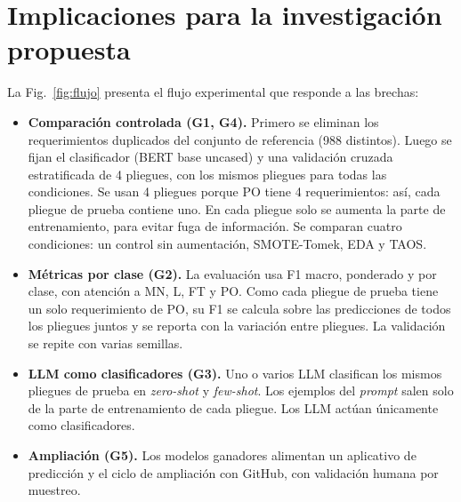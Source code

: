 \documentclass[conference]{IEEEtran}
\begin{document}
\section{Implicaciones para la investigación propuesta}\label{sec:propuesta}
La Fig.~\ref{fig:flujo} presenta el flujo experimental que responde a las brechas:
\begin{itemize}
  \item \textbf{Comparación controlada (G1, G4).} Primero se eliminan los requerimientos duplicados del conjunto de referencia (988 distintos). Luego se fijan el clasificador (BERT base uncased) y una validación cruzada estratificada de 4 pliegues, con los mismos pliegues para todas las condiciones. Se usan 4 pliegues porque PO tiene 4 requerimientos: así, cada pliegue de prueba contiene uno. En cada pliegue solo se aumenta la parte de entrenamiento, para evitar fuga de información. Se comparan cuatro condiciones: un control sin aumentación, SMOTE-Tomek, EDA y TAOS.
  \item \textbf{Métricas por clase (G2).} La evaluación usa F1 macro, ponderado y por clase, con atención a MN, L, FT y PO. Como cada pliegue de prueba tiene un solo requerimiento de PO, su F1 se calcula sobre las predicciones de todos los pliegues juntos y se reporta con la variación entre pliegues. La validación se repite con varias semillas.
  \item \textbf{LLM como clasificadores (G3).} Uno o varios LLM clasifican los mismos pliegues de prueba en \emph{zero-shot} y \emph{few-shot}. Los ejemplos del \emph{prompt} salen solo de la parte de entrenamiento de cada pliegue. Los LLM actúan únicamente como clasificadores.
  \item \textbf{Ampliación (G5).} Los modelos ganadores alimentan un aplicativo de predicción y el ciclo de ampliación con GitHub, con validación humana por muestreo.
\end{itemize}

\end{document}
